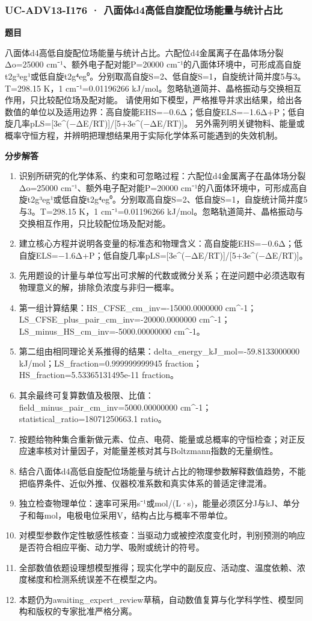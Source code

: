 \documentclass[UTF8,11pt,a4paper]{ctexart}
\begin{document}
\subsubsection*{UC-ADV13-I176 · 八面体d4高低自旋配位场能量与统计占比}
\noindent\textbf{题目}\par
八面体d4高低自旋配位场能量与统计占比。六配位d4金属离子在晶体场分裂Δo=25000 cm⁻¹、额外电子配对能P=20000 cm⁻¹的八面体环境中，可形成高自旋t2g³eg¹或低自旋t2g⁴eg⁰。分别取高自旋S=2、低自旋S=1，自旋统计简并度5与3。T=298.15 K，1 cm⁻¹=0.01196266 kJ/mol。忽略轨道简并、晶格振动与交换相互作用，只比较配位场及配对能。 请使用如下模型，严格推导并求出结果，给出各数值的单位以及适用边界：高自旋能EHS=−0.6Δ；低自旋ELS=−1.6Δ+P；低自旋几率pLS=[3e\textasciicircum{}(−ΔE/RT)]/[5+3e\textasciicircum{}(−ΔE/RT)]。 另外需列明关键物料、能量或概率守恒方程，并辨明把理想结果用于实际化学体系可能遇到的失效机制。\par
\medskip\noindent\textbf{分步解答}
\begin{enumerate}
\item 识别所研究的化学体系、约束和可忽略过程：六配位d4金属离子在晶体场分裂Δo=25000 cm⁻¹、额外电子配对能P=20000 cm⁻¹的八面体环境中，可形成高自旋t2g³eg¹或低自旋t2g⁴eg⁰。分别取高自旋S=2、低自旋S=1，自旋统计简并度5与3。T=298.15 K，1 cm⁻¹=0.01196266 kJ/mol。忽略轨道简并、晶格振动与交换相互作用，只比较配位场及配对能。
\item 建立核心方程并说明各变量的标准态和物理含义：高自旋能EHS=−0.6Δ；低自旋ELS=−1.6Δ+P；低自旋几率pLS=[3e\textasciicircum{}(−ΔE/RT)]/[5+3e\textasciicircum{}(−ΔE/RT)]。
\item 先用题设的计量与单位写出可求解的代数或微分关系；在逆问题中必须选取有物理意义的解，排除负浓度与非归一概率。
\item 第一组计算结果：HS\_CFSE\_cm\_inv=-15000.0000000 cm\textasciicircum{}-1；LS\_CFSE\_plus\_pair\_cm\_inv=-20000.0000000 cm\textasciicircum{}-1；LS\_minus\_HS\_cm\_inv=-5000.00000000 cm\textasciicircum{}-1。
\item 第二组由相同理论关系推得的结果：delta\_energy\_kJ\_mol=-59.8133000000 kJ/mol；LS\_fraction=0.999999999945 fraction；HS\_fraction=5.53365131495e-11 fraction。
\item 其余最终可复算数值及极限、比值：field\_minus\_pair\_cm\_inv=5000.00000000 cm\textasciicircum{}-1；statistical\_ratio=18071250663.1 ratio。
\item 按题给物种集合重新做元素、位点、电荷、能量或总概率的守恒检查；对正反应速率核对计量因子，对能量差核对其与Boltzmann指数的无量纲性。
\item 结合八面体d4高低自旋配位场能量与统计占比的物理参数解释数值趋势，不能把临界条件、近似外推、仪器校准系数和真实体系的普适定律混淆。
\item 独立检查物理单位：速率可采用s⁻¹或mol/(L·s)，能量必须区分J与kJ、单分子和每mol，电极电位采用V，结构占比与概率不带单位。
\item 对模型参数作定性敏感性核查：当驱动力或被控浓度变化时，判别预测的响应是否符合相应平衡、动力学、吸附或统计的符号。
\item 全部数值依题设理想模型推得；现实化学中的副反应、活动度、温度依赖、浓度梯度和检测系统误差不在模型之内。
\item 本题仍为awaiting\_expert\_review草稿，自动数值复算与化学科学性、模型同构和版权的专家批准严格分离。
\end{enumerate}
\end{document}
